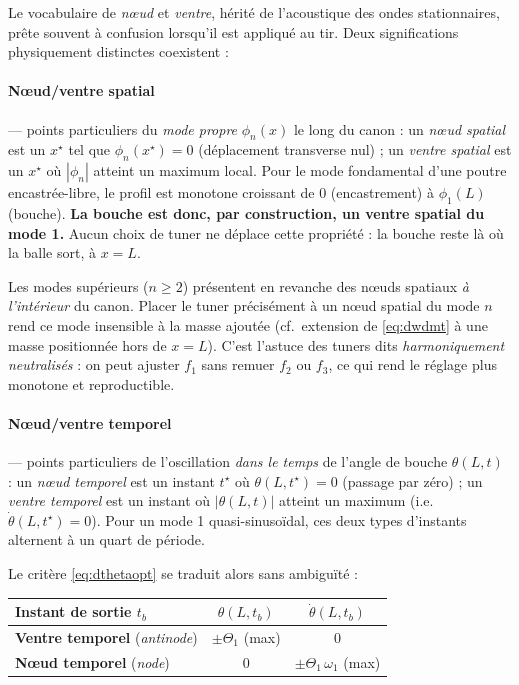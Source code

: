 \documentclass[12pt,a4paper]{article}
\begin{document}
	Le vocabulaire de \emph{nœud} et \emph{ventre}, hérité de l'acoustique des ondes stationnaires, prête souvent à confusion lorsqu'il est appliqué au tir. Deux significations physiquement distinctes coexistent :

	\paragraph{Nœud/ventre spatial} — points particuliers du \emph{mode propre} $\phi_n(x)$ le long du canon : un \emph{nœud spatial} est un $x^\star$ tel que $\phi_n(x^\star)=0$ (déplacement transverse nul) ; un \emph{ventre spatial} est un $x^\star$ où $|\phi_n|$ atteint un maximum local. Pour le mode fondamental d'une poutre encastrée-libre, le profil est monotone croissant de 0 (encastrement) à $\phi_1(L)$ (bouche). \textbf{La bouche est donc, par construction, un ventre spatial du mode 1.} Aucun choix de tuner ne déplace cette propriété : la bouche reste là où la balle sort, à $x=L$.

	Les modes supérieurs ($n\ge 2$) présentent en revanche des nœuds spatiaux \emph{à l'intérieur} du canon. Placer le tuner précisément à un nœud spatial du mode $n$ rend ce mode insensible à la masse ajoutée (cf.\ extension de \eqref{eq:dwdmt} à une masse positionnée hors de $x=L$). C'est l'astuce des tuners dits \emph{harmoniquement neutralisés} : on peut ajuster $f_1$ sans remuer $f_2$ ou $f_3$, ce qui rend le réglage plus monotone et reproductible.

	\paragraph{Nœud/ventre temporel} — points particuliers de l'oscillation \emph{dans le temps} de l'angle de bouche $\theta(L,t)$ : un \emph{nœud temporel} est un instant $t^\star$ où $\theta(L,t^\star)=0$ (passage par zéro) ; un \emph{ventre temporel} est un instant où $|\theta(L,t)|$ atteint un maximum (i.e.\ $\dot\theta(L,t^\star)=0$). Pour un mode 1 quasi-sinusoïdal, ces deux types d'instants alternent à un quart de période.

	Le critère \eqref{eq:dthetaopt} se traduit alors sans ambiguïté :
	\begin{center}
	\begin{tabular}{lcc}
		\toprule
		Instant de sortie $t_b$ & $\theta(L,t_b)$ & $\dot\theta(L,t_b)$ \\
		\midrule
		\textbf{Ventre temporel} (\textit{antinode}) & $\pm\Theta_1$ (max) & $0$ \\
		\textbf{Nœud temporel} (\textit{node}) & $0$ & $\pm\Theta_1\,\omega_1$ (max) \\
		\bottomrule
	\end{tabular}
	\end{center}
\end{document}
